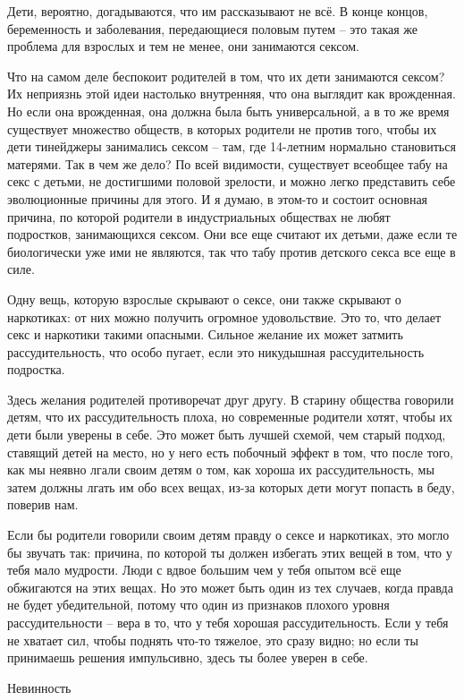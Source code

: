 \documentclass[ebook,12pt,oneside,openany]{memoir}
\begin{document}
Дети, вероятно, догадываются, что им рассказывают не всё. В конце
концов, беременность и заболевания, передающиеся половым путем -- это
такая же проблема для взрослых и тем не менее, они занимаются сексом.

Что на самом деле беспокоит родителей в том, что их дети занимаются
сексом? Их неприязнь этой идеи настолько внутренняя, что она выглядит
как врожденная. Но если она врожденная, она должна была быть
универсальной, а в то же время существует множество обществ, в которых
родители не против того, чтобы их дети тинейджеры занимались сексом --
там, где 14-летним нормально становиться матерями. Так в чем же дело?
По всей видимости, существует всеобщее табу на секс с детьми, не
достигшими половой зрелости, и можно легко представить себе
эволюционные причины для этого. И я думаю, в этом-то и состоит
основная причина, по которой родители в индустриальных обществах не
любят подростков, занимающихся сексом. Они все еще считают их детьми,
даже если те биологически уже ими не являются, так что табу против
детского секса все еще в силе.

Одну вещь, которую взрослые скрывают о сексе, они также скрывают о
наркотиках: от них можно получить огромное удовольствие. Это то, что
делает секс и наркотики такими опасными. Сильное желание их может
затмить рассудительность, что особо пугает, если это никудышная
рассудительность подростка.

Здесь желания родителей противоречат друг другу. В старину общества
говорили детям, что их рассудительность плоха, но современные родители
хотят, чтобы их дети были уверены в себе. Это может быть лучшей
схемой, чем старый подход, ставящий детей на место, но у него есть
побочный эффект в том, что после того, как мы неявно лгали своим детям
о том, как хороша их рассудительность, мы затем должны лгать им обо
всех вещах, из-за которых дети могут попасть в беду, поверив нам.

Если бы родители говорили своим детям правду о сексе и наркотиках, это
могло бы звучать так: причина, по которой ты должен избегать этих
вещей в том, что у тебя мало мудрости. Люди с вдвое большим чем у тебя
опытом всё еще обжигаются на этих вещах. Но это может быть один из тех
случаев, когда правда не будет убедительной, потому что один из
признаков плохого уровня рассудительности -- вера в то, что у тебя
хорошая рассудительность. Если у тебя не хватает сил, чтобы поднять
что-то тяжелое, это сразу видно; но если ты принимаешь решения
импульсивно, здесь ты более уверен в себе.

Невинность
\end{document}
